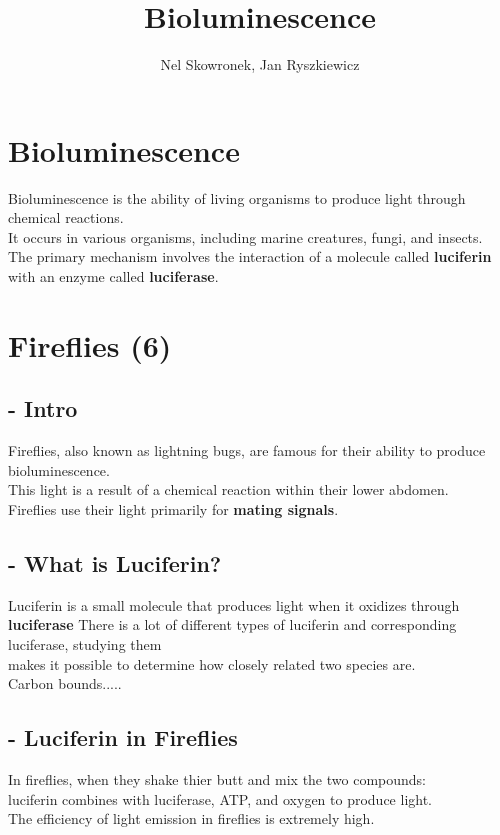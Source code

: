 \documentclass{article}
\title{Bioluminescence}
\author{Nel Skowronek, Jan Ryszkiewicz}
\date{}
\begin{document}
\maketitle

\section*{Bioluminescence}
Bioluminescence is the ability of living organisms to produce light through chemical reactions. \\
It occurs in various organisms, including marine creatures, fungi, and insects.\\
The primary mechanism involves the interaction of a molecule called \textbf{luciferin} with an enzyme called \textbf{luciferase}.


\section*{Fireflies (6)}

\subsection*{- Intro }
Fireflies, also known as lightning bugs, are famous for their ability to produce bioluminescence.\\ 
This light is a result of a chemical reaction within their lower abdomen.\\ 
Fireflies use their light primarily for \textbf{mating signals}.

\subsection*{- What is Luciferin? }
Luciferin is a small molecule that produces light when it oxidizes through \textbf{luciferase}
There is a lot of different types of luciferin and corresponding luciferase, studying them \\
makes it possible to determine how closely related two species are.\\
Carbon bounds.....

\subsection*{- Luciferin in Fireflies }
In fireflies, when they shake thier butt and mix the two compounds:\\
luciferin combines with luciferase, ATP, and oxygen to produce light.\\
The efficiency of light emission in fireflies is extremely high.\\
\end{document}

